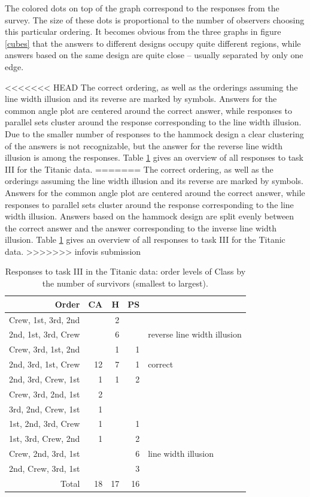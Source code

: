 The colored dots on top of the graph correspond to the responses from the survey. The size of these dots is proportional to the number of observers choosing this particular ordering. It becomes obvious from the three graphs in figure \ref{cubes} that
the answers to different designs occupy quite different regions, while answers based  on the same design are quite close --  usually separated by only one edge. 

<<<<<<< HEAD
The correct ordering, as well as the orderings assuming the line width illusion and its reverse are marked by symbols. Answers for the common angle plot are centered around the correct answer, while responses to parallel sets  cluster around the response corresponding to the line width illusion. Due to the smaller number of responses to the hammock design a clear clustering of the answers is not recognizable, but the answer for the reverse line width illusion is among the responses. Table \ref{a2} gives an overview of all responses to task III for the Titanic data.
=======
The correct ordering, as well as the orderings assuming the line width illusion and its reverse are marked by symbols. Answers for the common angle plot are centered around the correct answer, while responses to parallel sets  cluster around the response corresponding to the line width illusion. Answers based on the hammock design are split evenly between the correct answer and the answer corresponding to the  inverse line width illusion. Table \ref{a2} gives an overview of all responses to task III for the Titanic data.
>>>>>>> infovis submission

\begin{table}[ht]
\begin{center}
\begin{tabular}{rrrrl}\hline
Order  & CA & H & PS\\
  \hline
  Crew, 1st, 3rd, 2nd &  &  2 &  \\ \rowcolor{LightGrey}
  2nd, 1st, 3rd, Crew &  &  6 &  & reverse line width illusion \\ 
   Crew, 3rd, 1st, 2nd &  &  1 &  1 \\ \rowcolor{LightGrey}
  2nd, 3rd, 1st, Crew & 12 & 7 & 1 & correct\\  
  2nd, 3rd, Crew, 1st & 1 &  1 &  2 \\
  Crew, 3rd, 2nd, 1st &  2 &  &  \\ 
  3rd, 2nd, Crew, 1st &  1 &  &  \\ 
  1st, 2nd, 3rd, Crew &  1 &  &  1 \\ 
  1st, 3rd, Crew, 2nd &  1 &  &  2 \\ \rowcolor{LightGrey}
  Crew, 2nd, 3rd, 1st &  &  & 6 &  line width illusion\\  
  2nd, Crew, 3rd, 1st &  &  &  3 \\ 
   \hline
  Total & 18 & 17 & 16 \\ 
   \hline
\end{tabular}
\end{center}
\caption{\label{a2} Responses to task III in the Titanic data: order levels of Class by the number of survivors (smallest to largest). }
\end{table}

